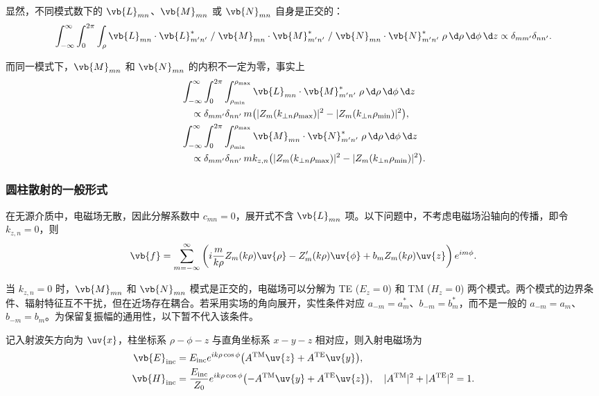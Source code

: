 显然，不同模式数下的 \(\vb{L}_{mn}\)、\(\vb{M}_{mn}\) 或 \(\vb{N}_{mn}\) 自身是正交的：
\begin{equation*}
	\int_{-\infty}^{\infty} \int_0^{2\pi} \int_\rho \vb{L}_{mn} \cdot \vb{L}_{m'n'}^* \;/\; \vb{M}_{mn} \cdot \vb{M}_{m'n'}^* \;/\; \vb{N}_{mn} \cdot \vb{N}_{m'n'}^* \; \rho \,\d \rho \,\d \phi \,\d z \propto \delta_{mm'}\delta_{nn'}.
\end{equation*}

而同一模式下，\(\vb{M}_{mn}\) 和 \(\vb{N}_{mn}\) 的内积不一定为零，事实上
\begin{align*}
	 & \int_{-\infty}^{\infty} \int_0^{2\pi} \int_{\rho_{\min}}^{\rho_{\max}} \vb{L}_{mn} \cdot \vb{M}_{m'n'}^* \; \rho \,\d \rho \,\d \phi \,\d z \\
	 & \quad \propto \delta_{mm'}\delta_{nn'} \, m \bigl( |Z_m(k_{\perp n}\rho_{\max})|^2 - |Z_m(k_{\perp n}\rho_{\min})|^2 \bigr),                \\
	 & \int_{-\infty}^{\infty} \int_0^{2\pi} \int_{\rho_{\min}}^{\rho_{\max}} \vb{M}_{mn} \cdot \vb{N}_{m'n'}^* \; \rho \,\d \rho \,\d \phi \,\d z \\
	 & \quad \propto \delta_{mm'}\delta_{nn'} \, m k_{z,n} \bigl( |Z_m(k_{\perp n}\rho_{\max})|^2 - |Z_m(k_{\perp n}\rho_{\min})|^2 \bigr).
\end{align*}

\subsubsection{圆柱散射的一般形式}
在无源介质中，电磁场无散，因此分解系数中 \(c_{mn} = 0\)，展开式不含 \(\vb{L}_{mn}\) 项。以下问题中，不考虑电磁场沿轴向的传播，即令 \(k_{z,n} = 0\)，则
\begin{equation*}
	\vb{f} = \sum_{m=-\infty}^{\infty} \left( i\frac{m}{k\rho} Z_m(k\rho) \uv{\rho} - Z_m'(k\rho) \uv{\phi} + b_m Z_m(k\rho) \uv{z} \right) e^{im\phi}.
\end{equation*}

	当 \(k_{z,n} = 0\) 时，\(\vb{M}_{mn}\) 和 \(\vb{N}_{mn}\) 模式是正交的，电磁场可以分解为 TE (\(E_z = 0\)) 和 TM (\(H_z = 0\)) 两个模式。两个模式的边界条件、辐射特征互不干扰，但在近场存在耦合。若采用实场的角向展开，实性条件对应 \(a_{-m}=a_m^*\)、\(b_{-m}=b_m^*\)，而不是一般的 \(a_{-m}=a_m\)、\(b_{-m}=b_m\)。为保留复振幅的通用性，以下暂不代入该条件。

记入射波矢方向为 \(\uv{x}\)，柱坐标系 \(\rho\!-\!\phi\!-\!z\) 与直角坐标系 \(x\!-\!y\!-\!z\) 相对应，则入射电磁场为
\begin{align*}
	\vb{E}_{\rm inc} & = E_{\rm inc} e^{ik\rho\cos\phi} \bigl( A^{\rm TM} \uv{z} + A^{\rm TE} \uv{y} \bigr),                    \\
	\vb{H}_{\rm inc} & = \frac{E_{\rm inc}}{Z_0} e^{ik\rho\cos\phi} \bigl( -A^{\rm TM} \uv{y} + A^{\rm TE} \uv{z} \bigr), \quad
	|A^{\rm TM}|^2 + |A^{\rm TE}|^2 = 1.
\end{align*}

